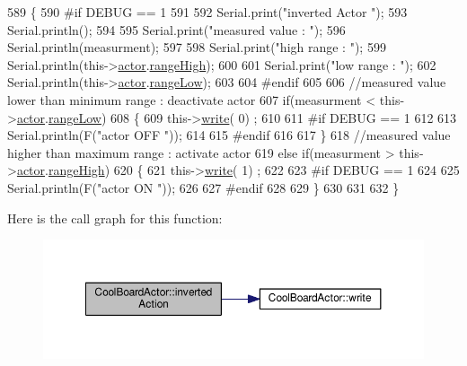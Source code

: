 \begin{DoxyCode}
589 \{
590 \textcolor{preprocessor}{#if DEBUG == 1}
591     
592     Serial.print(\textcolor{stringliteral}{"inverted Actor "});
593     Serial.println();
594 
595     Serial.print(\textcolor{stringliteral}{"measured value : "});
596     Serial.println(measurment);
597 
598     Serial.print(\textcolor{stringliteral}{"high range : "});
599     Serial.println(this->\hyperlink{class_cool_board_actor_a8f190db9f7a39fddbcef7f152da970e9}{actor}.\hyperlink{struct_cool_board_actor_1_1state_a6e5cd6c5cd44e2decfd8d4df1853f8e3}{rangeHigh});
600 
601     Serial.print(\textcolor{stringliteral}{"low range : "});
602     Serial.println(this->\hyperlink{class_cool_board_actor_a8f190db9f7a39fddbcef7f152da970e9}{actor}.\hyperlink{struct_cool_board_actor_1_1state_a43f891c9fb3bb63575c27cec860de55a}{rangeLow});
603 
604 \textcolor{preprocessor}{#endif}
605 
606     \textcolor{comment}{//measured value lower than minimum range : deactivate actor}
607     \textcolor{keywordflow}{if}(measurment < this->\hyperlink{class_cool_board_actor_a8f190db9f7a39fddbcef7f152da970e9}{actor}.\hyperlink{struct_cool_board_actor_1_1state_a43f891c9fb3bb63575c27cec860de55a}{rangeLow})
608     \{
609         this->\hyperlink{class_cool_board_actor_a958786ff01ea1056ee72c72d439f86da}{write}( 0) ;
610 
611 \textcolor{preprocessor}{    #if DEBUG == 1 }
612 
613         Serial.println(F(\textcolor{stringliteral}{"actor OFF "}));
614     
615 \textcolor{preprocessor}{    #endif}
616 
617     \}
618     \textcolor{comment}{//measured value higher than maximum range : activate actor}
619     \textcolor{keywordflow}{else} \textcolor{keywordflow}{if}(measurment > this->\hyperlink{class_cool_board_actor_a8f190db9f7a39fddbcef7f152da970e9}{actor}.\hyperlink{struct_cool_board_actor_1_1state_a6e5cd6c5cd44e2decfd8d4df1853f8e3}{rangeHigh})
620     \{
621         this->\hyperlink{class_cool_board_actor_a958786ff01ea1056ee72c72d439f86da}{write}( 1) ;
622 
623 \textcolor{preprocessor}{    #if DEBUG == 1 }
624 
625         Serial.println(F(\textcolor{stringliteral}{"actor ON "}));
626     
627 \textcolor{preprocessor}{    #endif}
628 
629     \}
630 
631 
632 \}
\end{DoxyCode}
Here is the call graph for this function\+:\nopagebreak
\begin{figure}[H]
\begin{center}
\leavevmode
\includegraphics[width=350pt]{dc/d69/class_cool_board_actor_aae82b2e62f91be009d40f93c206f9bda_cgraph}
\end{center}
\end{figure}
